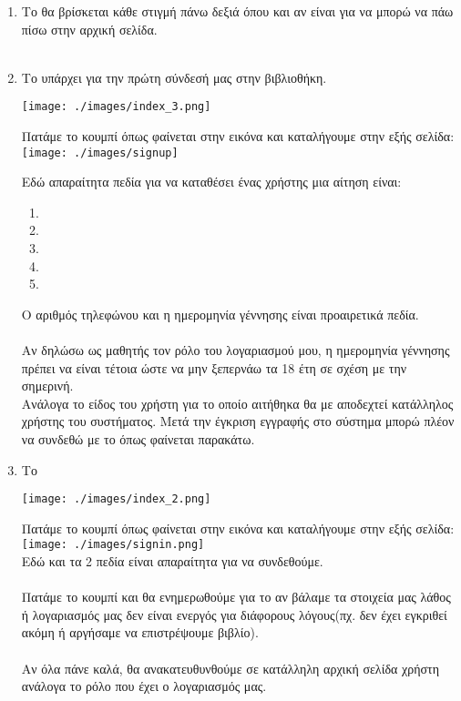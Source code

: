 \documentclass[14pt]{report}
\begin{document}
	\begin{enumerate}
		\newpage
		\item Το  θα βρίσκεται κάθε στιγμή πάνω δεξιά όπου και αν είναι για να μπορώ να πάω πίσω στην αρχική σελίδα. \\ \\
		\item Το  υπάρχει για την πρώτη σύνδεσή μας στην βιβλιοθήκη.
		\begin{center}
			\texttt{[image: ./images/index\_3.png]}
		\end{center}
		Πατάμε το κουμπί όπως φαίνεται στην εικόνα και καταλήγουμε στην εξής σελίδα: \\
		\texttt{[image: ./images/signup]}
		\par\vspace{2cm}
		Εδώ απαραίτητα πεδία για να καταθέσει ένας χρήστης μια αίτηση είναι: 
		\begin{enumerate}
			\item {}
			\item {}
			\item {}
			\item {}
			\item {}
		\end{enumerate}
		Ο αριθμός τηλεφώνου και η ημερομηνία γέννησης είναι προαιρετικά πεδία. \\ \\
		Αν δηλώσω ως μαθητής τον ρόλο του λογαριασμού μου, η ημερομηνία γέννησης πρέπει να είναι τέτοια ώστε να μην ξεπερνάω τα 18 έτη σε σχέση με την σημερινή. \\
		Ανάλογα το είδος του χρήστη για το οποίο αιτήθηκα θα με αποδεχτεί κατάλληλος χρήστης του συστήματος. Μετά την έγκριση εγγραφής στο σύστημα μπορώ πλέον να συνδεθώ με το  όπως φαίνεται παρακάτω. \\	
		\item Το  
		\begin{center}
			\texttt{[image: ./images/index\_2.png]}
		\end{center}
		Πατάμε το κουμπί όπως φαίνεται στην εικόνα και καταλήγουμε στην εξής σελίδα: \\
		\texttt{[image: ./images/signin.png]} \\
		Εδώ και τα 2 πεδία είναι απαραίτητα για να συνδεθούμε. \\ \\ Πατάμε το κουμπί  και θα ενημερωθούμε για το αν βάλαμε τα στοιχεία μας λάθος ή λογαριασμός μας δεν είναι ενεργός για διάφορους λόγους(πχ. δεν έχει εγκριθεί ακόμη ή αργήσαμε να επιστρέψουμε βιβλίο). \\ \\ Αν όλα πάνε καλά, θα ανακατευθυνθούμε σε κατάλληλη αρχική σελίδα χρήστη ανάλογα το ρόλο που έχει ο λογαριασμός μας.
	\end{enumerate}
\end{document}
